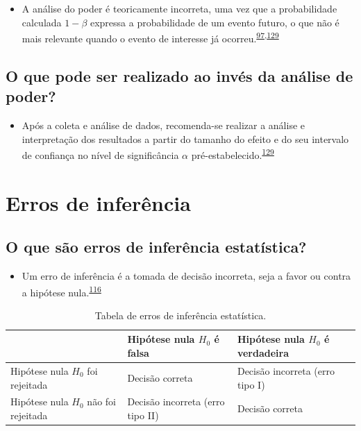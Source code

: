 \documentclass[
  a4paper,
]{book}
\providecommand{\tightlist}{%
  \setlength{\itemsep}{0pt}\setlength{\parskip}{0pt}}
\begin{document}
\begin{itemize}
\tightlist
\item
  A análise do poder é teoricamente incorreta, uma vez que a probabilidade calculada \(1-\beta\) expressa a probabilidade de um evento futuro, o que não é mais relevante quando o evento de interesse já ocorreu.\textsuperscript{\protect\hyperlink{ref-Cummings2003}{97},\protect\hyperlink{ref-heckman2022}{129}}
\end{itemize}

\hypertarget{o-que-pode-ser-realizado-ao-invuxe9s-da-anuxe1lise-de-poder}{%
\subsection{O que pode ser realizado ao invés da análise de poder?}\label{o-que-pode-ser-realizado-ao-invuxe9s-da-anuxe1lise-de-poder}}

\begin{itemize}
\tightlist
\item
  Após a coleta e análise de dados, recomenda-se realizar a análise e interpretação dos resultados a partir do tamanho do efeito e do seu intervalo de confiança no nível de significância \(\alpha\) pré-estabelecido.\textsuperscript{\protect\hyperlink{ref-heckman2022}{129}}
\end{itemize}

\hypertarget{erros-de-inferuxeancia}{%
\section{Erros de inferência}\label{erros-de-inferuxeancia}}

\hypertarget{o-que-suxe3o-erros-de-inferuxeancia-estatuxedstica}{%
\subsection{O que são erros de inferência estatística?}\label{o-que-suxe3o-erros-de-inferuxeancia-estatuxedstica}}

\begin{itemize}
\tightlist
\item
  Um erro de inferência é a tomada de decisão incorreta, seja a favor ou contra a hipótese nula.\textsuperscript{\protect\hyperlink{ref-Curran-Everett2009}{116}}
\end{itemize}

\begin{table}

\caption{\label{tab:erros-interencia}Tabela de erros de inferência estatística.}
\centering
\begin{tabu} to 
\toprule
  & Hipótese nula $H_{0}$ 
 é falsa & Hipótese nula $H_{0}$ 
\textbf{ é verdadeira}\\
\midrule
Hipótese nula $H_{0}$ 
 foi rejeitada & Decisão correta & Decisão incorreta 
 (erro tipo I)\\
Hipótese nula $H_{0}$ 
 não foi rejeitada & Decisão incorreta 
 (erro tipo II) & Decisão correta\\
\bottomrule
\end{tabu}
\end{table}
\end{document}
